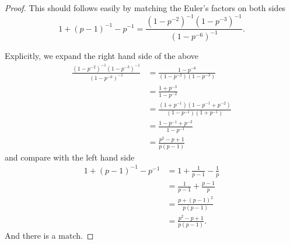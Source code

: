 \documentclass[12pt]{article}
\begin{document}
\begin{proof}
This should follows easily by matching the Euler's factors on both sides
$$1 + (p - 1)^{-1} - p^{-1} = \frac{(1 - p^{-2})^{-1} (1 - p^{-3})^{-1}}{(1 - p^{-6})^{-1}}.$$

Explicitly, we expand the right hand side of the above
\begin{align*}
\frac{(1 - p^{-2})^{-1} (1 - p^{-3})^{-1}}{(1 - p^{-6})^{-1}} &= \frac{1 - p^{-6}}{(1 - p^{-2}) (1 - p^{-3})}\\
&= \frac{1 + p^{-3}}{1 - p^{-2}}\\
&= \frac{(1 + p^{-1})(1 - p^{-1} + p^{-2})}{(1 - p^{-1})(1 + p^{-1})}\\
&= \frac{1 - p^{-1} + p^{-2}}{1 - p^{-1}}\\
&= \frac{p^2 - p + 1}{p(p-1)}
\end{align*}
and compare with the left hand side
\begin{align*}
1 + (p - 1)^{-1} - p^{-1} &= 1 + \frac{1}{p-1} - \frac{1}{p}\\
&= \frac{1}{p-1} + \frac{p - 1}{p}\\
&= \frac{p + (p-1)^2}{p(p-1)}\\
&= \frac{p^2 - p + 1}{p(p-1)}.
\end{align*}
And there is a match.
\end{proof}

\unless\ifdefined\IsMainDocument
\end{document}
